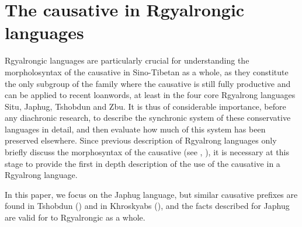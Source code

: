 \documentclass[oldfontcommands,oneside,a4paper,11pt]{article}
\newcommand{\ipa}[1]{{\phon \mbox{#1}}} %
\begin{document}
%
%
%


\section{The causative in Rgyalrongic languages}



Rgyalrongic languages are particularly crucial for understanding the morpholosyntax of the causative in Sino-Tibetan as a whole, as they constitute the only subgroup of the family where the causative is still fully productive and can be applied to recent loanwords, at least in the four core Rgyalrong languages Situ, Japhug, Tshobdun and Zbu. It is thus of considerable importance, before any diachronic research, to describe the synchronic system of these conservative languages in detail, and then evaluate how much of this system has been preserved elsewhere. Since previous description of Rgyalrong languages only briefly discuss the morphosyntax of the causative (see \citealt{jackson06paisheng}, \citealt{jacques08zh}), it is necessary at this stage to provide the first in depth description of the use of the causative in a Rgyalrong language.

In this paper, we focus on the Japhug language, but similar causative prefixes are found in Tshobdun (\citealt{jackson06paisheng, jackson13morpho}) and in Khroskyabs (\citealt{lai13affixale,lai14caus}), and the facts described for Japhug are  valid for to Rgyalrongic as a whole.
\end{document}
